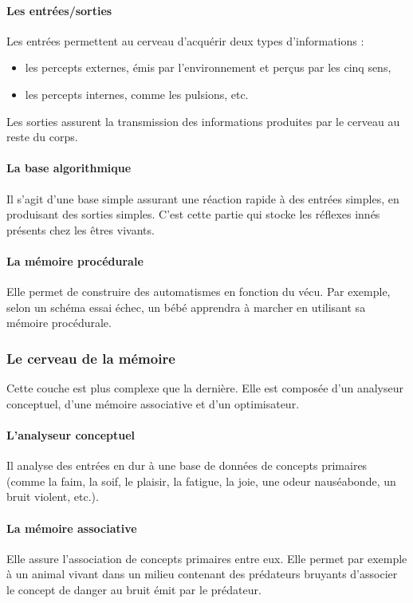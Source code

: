 \paragraph{Les entrées/sorties}
Les entrées permettent au cerveau d'acquérir deux types d'informations :
\begin{itemize}
\item les percepts externes, émis par l'environnement et perçus par les cinq sens,
\item les percepts internes, comme les pulsions, etc. 
\end{itemize}

Les sorties assurent la transmission des informations produites par le cerveau au reste du corps.

\paragraph{La base algorithmique} Il s'agit d'une base simple assurant une réaction rapide à des entrées simples, en produisant des sorties simples. C'est cette partie qui stocke les réflexes innés présents chez les êtres vivants. 

\paragraph{La mémoire procédurale} Elle permet de construire des automatismes en fonction du vécu. Par exemple, selon un schéma essai échec, un bébé apprendra à marcher en utilisant sa mémoire procédurale.

\subsubsection{Le cerveau de la mémoire} Cette couche est plus
complexe que la dernière. Elle est composée d'un analyseur conceptuel, d'une mémoire
associative et d'un optimisateur.

\paragraph {L'analyseur conceptuel} Il analyse des entrées en dur à une base de
données de concepts primaires (comme la faim, la soif, le plaisir, la fatigue, la joie, une odeur
nauséabonde, un bruit violent, etc.).
\paragraph {La mémoire associative} Elle assure l'association de concepts primaires
entre eux. Elle permet par exemple à un animal vivant dans un milieu contenant des prédateurs
bruyants d’associer le concept de danger au bruit émit par le prédateur.
